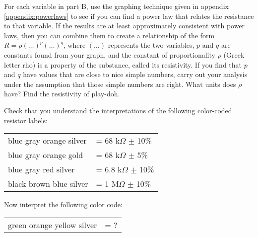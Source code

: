\analysis

For each variable in part B,
use the graphing technique given in appendix \ref{appendix:powerlaws} to see if you can
find a power law that relates the resistance to that variable. If the results are at least
approximately consistent with power laws, then you can combine them to create a relationship
of the form $R=\rho(\ldots)^p(\ldots)^q$, where $(\ldots)$ represents the two variables,
$p$ and $q$ are constants found from your graph, and the constant of proportionality $\rho$
(Greek letter rho) is a property of the substance, called its resistivity. If you find that
$p$ and $q$ have values that are close to nice simple numbers, carry out your analysis under
the assumption that those simple numbers are right. What units does $\rho$ have?
Find the resistivity of play-doh.

\prelab

\prelabquestion  Check that you understand the interpretations of the
following color-coded resistor labels:

\begin{tabular}{ll}
   blue   gray   orange   silver    &= 68 k$\Omega$  $\pm$ 10\%  \\
   blue   gray   orange   gold    &= 68 k$\Omega$  $\pm$ 5\%  \\
   blue   gray   red   silver    &= 6.8 k$\Omega$  $\pm$ 10\%  \\
   black   brown   blue   silver    &= 1 M$\Omega$  $\pm$ 10\%  
\end{tabular}

Now interpret the following color code:

\begin{tabular}{ll}
   green   orange   yellow   silver    &=    ?  
\end{tabular}
